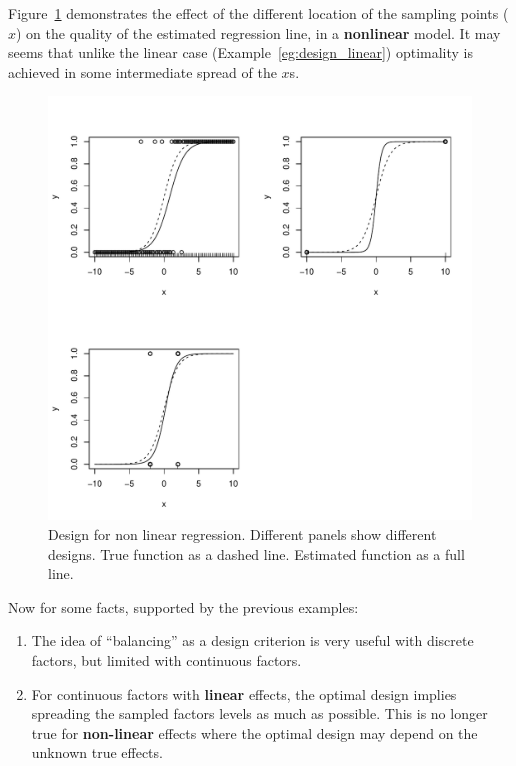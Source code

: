 \begin{example}
	\label{eg:design_non_linear}
	Figure~\ref{fig:design_nonlinear} demonstrates the effect of the different location of the sampling points ($x$) on the quality of the estimated regression line, in a \textbf{nonlinear} model.
	It may seems that unlike the linear case (Example~\ref{eg:design_linear}) optimality is achieved in some intermediate spread of the $x$s.
	\begin{figure}[h]
		\centering
		\includegraphics[height=0.3\textheight]{art/nonlinear}
		\caption[Design for Non Linear Models]{Design for non linear regression. Different panels show different designs. True function as a dashed line. Estimated function as a full line.}
		\label{fig:design_nonlinear}
	\end{figure}
\end{example}





Now for some facts, supported by the previous examples:
\begin{enumerate}
	\item The idea of ``balancing'' as a design criterion is very useful with discrete factors, but limited with continuous factors. 
	\item For continuous factors with \textbf{linear} effects, the optimal design implies spreading the sampled factors levels as much as possible. 
	This is no longer true for \textbf{non-linear} effects where the optimal design may depend on the unknown true effects. 
\end{enumerate}



